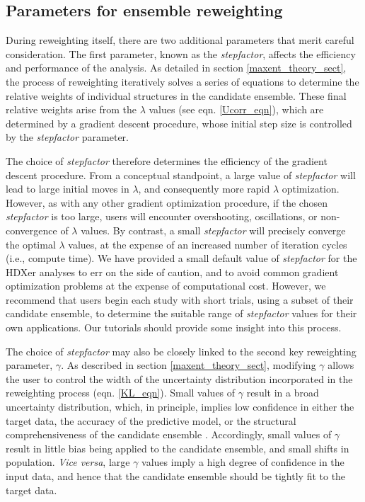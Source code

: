 \documentclass[9pt,tutorial]{livecoms}
\begin{document}
\subsection{Parameters for ensemble reweighting}
During reweighting itself, there are two additional parameters that merit careful consideration.
The first parameter, known as the \textit{stepfactor}, affects the efficiency and performance of the analysis. 
As detailed in section \ref{maxent_theory_sect}, the process of reweighting iteratively solves a series of equations to determine the relative weights of individual structures in the candidate ensemble.
These final relative weights arise from the $\lambda$ values (see eqn. \ref{Ucorr_eqn}), which are determined by a gradient descent procedure, whose initial step size is controlled by the \textit{stepfactor} parameter.

The choice of \textit{stepfactor} therefore determines the efficiency of the gradient descent procedure.
From a conceptual standpoint, a large value of \textit{stepfactor} will lead to large initial moves in $\lambda$, and consequently more rapid $\lambda$ optimization.
However, as with any other gradient optimization procedure, if the chosen \textit{stepfactor} is too large, users will encounter overshooting, oscillations, or non-convergence of $\lambda$ values.
By contrast, a small \textit{stepfactor} will precisely converge the optimal $\lambda$ values, at the expense of an increased number of iteration cycles (i.e., compute time).
We have provided a small default value of \textit{stepfactor} for the HDXer analyses to err on the side of caution, and to avoid common gradient optimization problems at the expense of computational cost.
However, we recommend that users begin each study with short trials, using a subset of their candidate ensemble, to determine the suitable range of \textit{stepfactor} values for their own applications.
Our tutorials should provide some insight into this process.

The choice of \textit{stepfactor} may also be closely linked to the second key reweighting parameter, $\gamma$.
As described in section \ref{maxent_theory_sect}, modifying $\gamma$ allows the user to control the width of the uncertainty distribution incorporated in the reweighting process (eqn. \ref{KL_eqn}).
Small values of $\gamma$ result in a broad uncertainty distribution, which, in principle, implies low confidence in either the target data, the accuracy of the predictive model, or the structural comprehensiveness of the candidate ensemble \cite{Orioli2020, Hummer2015}.
Accordingly, small values of $\gamma$ result in little bias being applied to the candidate ensemble, and small shifts in population.
\textit{Vice versa}, large $\gamma$ values imply a high degree of confidence in the input data, and hence that the candidate ensemble should be tightly fit to the target data.
\end{document}
